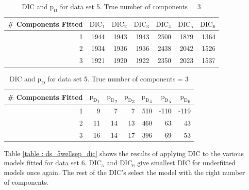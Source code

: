 \begin{table}[!htb]
\centering
\captionsetup{justification=centering}
\caption{DIC and $\text{p}_\text{D}$ for data set 5. True number of components = 3}
\label{table : ds_3fused_3ppg_dic}
\begin{tabular}{@{}rrrrrrr@{}}
\toprule
\# Components Fitted & $\text{DIC}_1$ & $\text{DIC}_2$  & $\text{DIC}_3$  & $\text{DIC}_4$  & $\text{DIC}_5$  & $\text{DIC}_6$  \\ \midrule
1 & 1944 & 1943 & 1943 & 2500 & 1879 & 1364 \\
2 & 1934 & 1936 & 1936 & 2438 & 2042 & 1526 \\
3 & 1921 & 1920 & 1922 & 2350 & 2023 & 1537\\
\bottomrule
\end{tabular}

\begin{tabular}{@{}rrrrrrr@{}}
\toprule
\# Components Fitted & ${\text{p}_\text{D}}_1$ & ${\text{p}_\text{D}}_2$ & ${\text{p}_\text{D}}_3$ & ${\text{p}_\text{D}}_4$ & ${\text{p}_\text{D}}_5$ & ${\text{p}_\text{D}}_6$ \\ \midrule
1 & 9 & 7 & 7 & 510 & -110 & -119 \\
2 & 11 & 14 & 13 & 460 & 63 & 43 \\
3 & 16 & 14 & 17 & 396 & 69 & 53 \\
\bottomrule
\end{tabular}
\end{table}

Table \ref{table : ds_5wellsep_dic} shows the results of applying DIC to the various models fitted for data set 6. $\text{DIC}_5$ and $\text{DIC}_6$ give smallest DIC for underfitted models once again. The rest of the DIC's select the model with the right number of components.\\

